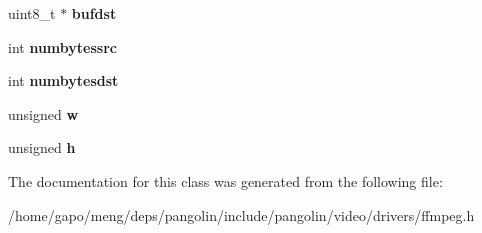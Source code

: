 \begin{DoxyCompactItemize}
\item 
uint8\+\_\+t $\ast$ {\bfseries bufdst}\hypertarget{classpangolin_1_1_ffmpeg_converter_aaad093a9400770306758419b14617d3f}{}\label{classpangolin_1_1_ffmpeg_converter_aaad093a9400770306758419b14617d3f}

\item 
int {\bfseries numbytessrc}\hypertarget{classpangolin_1_1_ffmpeg_converter_a29d46022dbf371499178da6a2790b584}{}\label{classpangolin_1_1_ffmpeg_converter_a29d46022dbf371499178da6a2790b584}

\item 
int {\bfseries numbytesdst}\hypertarget{classpangolin_1_1_ffmpeg_converter_a137ced15d2543031b8b6a643641a7ab0}{}\label{classpangolin_1_1_ffmpeg_converter_a137ced15d2543031b8b6a643641a7ab0}

\item 
unsigned {\bfseries w}\hypertarget{classpangolin_1_1_ffmpeg_converter_ae9e979fcd4f74680da019cb2ecfebb0e}{}\label{classpangolin_1_1_ffmpeg_converter_ae9e979fcd4f74680da019cb2ecfebb0e}

\item 
unsigned {\bfseries h}\hypertarget{classpangolin_1_1_ffmpeg_converter_aa0e124d177b5b4a3d7fb69ca9de2e98f}{}\label{classpangolin_1_1_ffmpeg_converter_aa0e124d177b5b4a3d7fb69ca9de2e98f}

\end{DoxyCompactItemize}


The documentation for this class was generated from the following file\+:\begin{DoxyCompactItemize}
\item 
/home/gapo/meng/deps/pangolin/include/pangolin/video/drivers/ffmpeg.\+h\end{DoxyCompactItemize}
